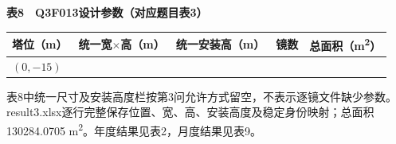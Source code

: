 \documentclass[UTF8,fontset=windows,zihao=-4]{ctexart}
\begin{document}
\par\medskip\noindent\begin{minipage}{\linewidth}
\small
\textbf{表8　Q3F013设计参数（对应题目表3）}\par\smallskip
\begin{tabular}{>{\raggedright\arraybackslash}p{0.200000\dimexpr\linewidth-10\tabcolsep\relax}>{\raggedright\arraybackslash}p{0.200000\dimexpr\linewidth-10\tabcolsep\relax}>{\raggedright\arraybackslash}p{0.200000\dimexpr\linewidth-10\tabcolsep\relax}>{\raggedright\arraybackslash}p{0.200000\dimexpr\linewidth-10\tabcolsep\relax}>{\raggedright\arraybackslash}p{0.200000\dimexpr\linewidth-10\tabcolsep\relax}}
\toprule
塔位（m） & 统一宽\(\times\)高（m） & 统一安装高（m） & 镜数 & 总面积（m\textsuperscript{2}） \\
\midrule
\((0,-15)\) &  &  & 2981 & 130284.0705 \\
\bottomrule
\end{tabular}
\end{minipage}\par\medskip

表8中统一尺寸及安装高度栏按第3问允许方式留空，不表示逐镜文件缺少参数。result3.xlsx逐行完整保存位置、宽、高、安装高度及稳定身份映射；总面积 130284.0705 m\textsuperscript{2}。年度结果见表2，月度结果见表9。
\end{document}
